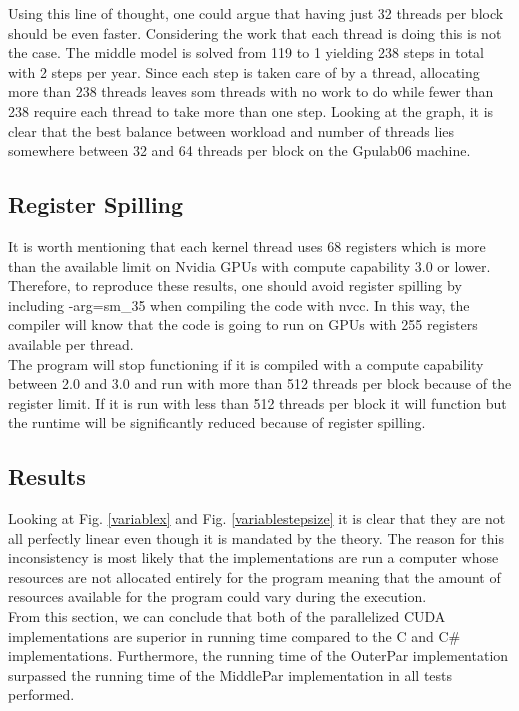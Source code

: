 Using this line of thought, one could argue that having just 32 threads per block should be even faster. Considering the work that each thread is doing this is not the case. The middle model is solved from 119 to 1 yielding 238 steps in total with 2 steps per year. Since each step is taken care of by a thread, allocating more than 238 threads leaves som threads with no work to do while fewer than 238 require each thread to take more than one step. Looking at the graph, it is clear that the best balance between workload and number of threads lies somewhere between 32 and 64 threads per block on the Gpulab06 machine.

\subsection{Register Spilling}
It is worth mentioning that each kernel thread uses 68 registers which is more than the available limit on Nvidia GPUs with compute capability 3.0 or lower. Therefore, to reproduce these results, one should avoid register spilling by including -arg=sm\_35 when compiling the code with nvcc. In this way, the compiler will know that the code is going to run on GPUs with 255 registers available per thread. \\

The program will stop functioning if it is compiled with a compute capability between 2.0 and 3.0 and run with more than 512 threads per block because of the register limit. If it is run with less than 512 threads per block it will function but the runtime will be significantly reduced because of register spilling. 

\subsection{Results}
Looking at Fig. \ref{variablex} and Fig. \ref{variablestepsize} it is clear that they are not all perfectly linear even though it is mandated by the theory. The reason for this inconsistency is most likely that the implementations are run a computer whose resources are not allocated entirely for the program meaning that the amount of resources available for the program could vary during the execution. \\

From this section, we can conclude that both of the parallelized CUDA implementations are superior in running time compared to the C and C\# implementations. Furthermore, the running time of the OuterPar implementation surpassed the running time of the MiddlePar implementation in all tests performed.